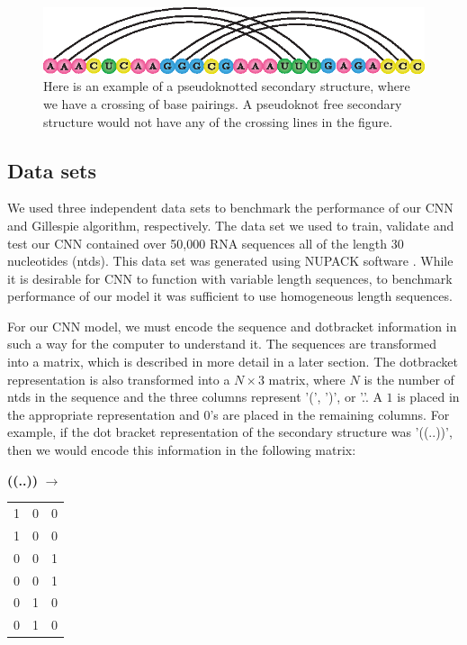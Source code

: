 \documentclass[11pt]{article}
\begin{document}
\begin{figure}[H]
    \centering
    \includegraphics[width = \textwidth]{fig/pseudoknot.eps}
    \caption{Here is an example of a pseudoknotted secondary structure, where we have a crossing of base pairings. A pseudoknot free secondary structure would not have any of the crossing lines in the figure.}
    \label{fig:pseudo}
\end{figure}


\begin{multicols}{2}
\section{Data sets}
We used three independent data sets to benchmark the performance of our CNN and Gillespie algorithm, respectively. The data set we used to train, validate and test our CNN contained over 50,000 RNA sequences all of the length 30 nucleotides (ntds). This data set was generated using NUPACK software \cite{doi:10.1002/jcc.21596}. While it is desirable for CNN to function with variable length sequences, to benchmark performance of our model it was sufficient to use homogeneous length sequences.

For our CNN model, we must encode the sequence and dotbracket information in such a way for the computer to understand it. The sequences are transformed into a matrix, which is described in more detail in a later section. The dotbracket representation is also transformed into a $N \times 3$ matrix, where $N$ is the number of ntds in the sequence and the three columns represent '(', ')', or '.'. A $1$ is placed in the appropriate representation and $0$'s are placed in the remaining columns. For example, if the dot bracket representation of the secondary structure was '((..))', then we would encode this information in the following matrix:
\begin{center}
{\bf ((..))} \hspace{0.1cm} $ \rightarrow$ \hspace{0.1cm}
\begin{tabular}{|c|c|c|}
\hline
1 & 0 & 0\\
1 & 0 & 0\\
0 & 0 & 1\\
0 & 0 & 1\\
0 & 1 & 0\\
0 & 1 & 0\\
\end{tabular}


\end{center}
\end{multicols}
\end{document}
